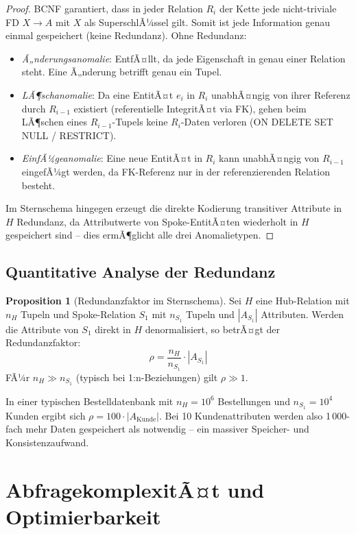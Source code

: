 ﻿\documentclass[a4paper,12pt]{report}
\theoremstyle{definition}
\newtheorem{proposition}[theorem]{Proposition}
\theoremstyle{remark}
\begin{document}
\begin{proof}
BCNF garantiert, dass in jeder Relation $R_i$ der Kette jede nicht-triviale
FD $X \to A$ mit $X$ als SuperschlÃ¼ssel gilt. Somit ist jede Information
genau einmal gespeichert (keine Redundanz). Ohne Redundanz:
\begin{itemize}
  \item \emph{Ã„nderungsanomalie}: EntfÃ¤llt, da jede Eigenschaft in genau einer
        Relation steht. Eine Ã„nderung betrifft genau ein Tupel.
  \item \emph{LÃ¶schanomalie}: Da eine EntitÃ¤t $e_i$ in $R_i$ unabhÃ¤ngig von
        ihrer Referenz durch $R_{i-1}$ existiert (referentielle IntegritÃ¤t
        via FK), gehen beim LÃ¶schen eines $R_{i-1}$-Tupels keine $R_i$-Daten
        verloren (ON DELETE SET NULL / RESTRICT).
  \item \emph{EinfÃ¼geanomalie}: Eine neue EntitÃ¤t in $R_i$ kann unabhÃ¤ngig
        von $R_{i-1}$ eingefÃ¼gt werden, da FK-Referenz nur in der
        referenzierenden Relation besteht.
\end{itemize}
Im Sternschema hingegen erzeugt die direkte Kodierung transitiver Attribute
in $H$ Redundanz, da Attributwerte von Spoke-EntitÃ¤ten wiederholt in $H$
gespeichert sind -- dies ermÃ¶glicht alle drei Anomalietypen.
\end{proof}

\subsection{Quantitative Analyse der Redundanz}

\begin{proposition}[Redundanzfaktor im Sternschema]
\label{prop:redundanz}
Sei $H$ eine Hub-Relation mit $n_H$ Tupeln und Spoke-Relation $S_1$ mit
$n_{S_1}$ Tupeln und $|A_{S_1}|$ Attributen. Werden die Attribute von $S_1$
direkt in $H$ denormalisiert, so betrÃ¤gt der Redundanzfaktor:
\[
  \rho = \frac{n_H}{n_{S_1}} \cdot |A_{S_1}|
\]
FÃ¼r $n_H \gg n_{S_1}$ (typisch bei 1:n-Beziehungen) gilt $\rho \gg 1$.
\end{proposition}

In einer typischen Bestelldatenbank mit $n_H = 10^6$ Bestellungen und
$n_{S_1} = 10^4$ Kunden ergibt sich $\rho = 100 \cdot |A_{\text{Kunde}}|$.
Bei 10 Kundenattributen werden also 1\,000-fach mehr Daten gespeichert
als notwendig -- ein massiver Speicher- und Konsistenzaufwand.

\section{AbfragekomplexitÃ¤t und Optimierbarkeit}
\label{sec:abfragen}
\end{document}

